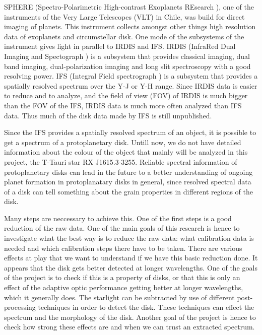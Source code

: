 \documentclass[twoside,single]{lion-msc}
\begin{document}
SPHERE (Spectro-Polarimetric High-contrast Exoplanets REsearch \citep{Beuzit2008}), one of the instruments of the Very Large Telescopes (VLT) in Chile, was build for direct imaging of planets. This instrument collects amongst other things high resolution data of exoplanets and circumstellar disk. One mode of the subsystems of the instrument gives light in parallel to IRDIS and IFS. IRDIS (InfraRed Dual Imaging and Spectograph \cite{Dohlen2008}) is a subsystem that provides classical imaging, dual band imaging, dual-polarization imaging and long slit spectroscopy with a good resolving power. IFS (Integral Field spectrograph \citep{Claudi2006}) is a subsystem that provides a spatially resolved spectrum over the Y-J or Y-H range. Since IRDIS data is easier to reduce and to analyze, and the field of view (FOV) of IRDIS is much bigger than the FOV of the IFS, IRDIS data is much more often analyzed than IFS data. Thus much of the disk data made by IFS is still unpublished.
\bigskip

Since the IFS provides a spatially resolved spectrum of an object, it is possible to get a spectrum of a protoplanetary disk. Untill now, we do not have detailed information about the colour of the object that mainly will be analyzed in this project, the T-Tauri star RX J1615.3-3255. Reliable spectral information of protoplanetary disks can lead in the future to a better understanding of ongoing planet formation in protoplanatary disks in general, since resolved spectral data of a disk can tell something about the grain properties in different regions of the disk.
\bigskip

Many steps are neccessary to achieve this. One of the first steps is a good reduction of the raw data. One of the main goals of this research is hence to investigate what the best way is to reduce the raw data: what calibration data is needed and which calibration steps there have to be taken. There are various effects at play that we want to understand if we have this basic reduction done. It appears that the disk gets better detected at longer wavelengths. One of the goals of the project is to check if this is a property of disks, or that this is only an effect of the adaptive optic performance getting better at longer wavelengths, which it generally does. The starlight can be subtracted by use of different post-processing techniques in order to detect the disk. These techniques can effect the spectrum and the morphology of the disk. Another goal of the project is hence to check how strong these effects are and when we can trust an extracted spectrum.
\bigskip
\end{document}
